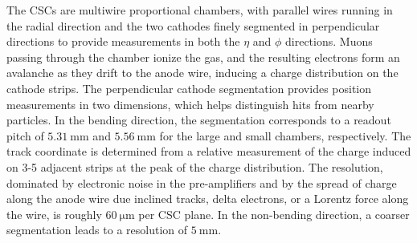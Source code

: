 The CSCs are multiwire proportional chambers, with parallel wires running in the radial direction and the two cathodes finely segmented in perpendicular directions to provide measurements in both the $\eta$ and $\phi$ directions. Muons passing through the chamber ionize the gas, and the resulting electrons form an avalanche as they drift to the anode wire, inducing a charge distribution on the cathode strips. The perpendicular cathode segmentation provides position measurements in two dimensions, which helps distinguish hits from nearby particles. In the bending direction, the segmentation corresponds to a readout pitch of $\SI{5.31}{\milli\meter}$ and $\SI{5.56}{\milli\meter}$ for the large and small chambers, respectively.  The track coordinate is determined from a relative measurement of the charge induced on 3-5 adjacent strips at the peak of the charge distribution. The resolution, dominated by electronic noise in the pre-amplifiers and by the spread of charge along the anode wire due inclined tracks, delta electrons, or a Lorentz force along the wire, is roughly $\SI{60}{\micro\meter}$ per CSC plane. In the non-bending direction, a coarser segmentation leads to a resolution of $\SI{5}{\milli\meter}$. 

